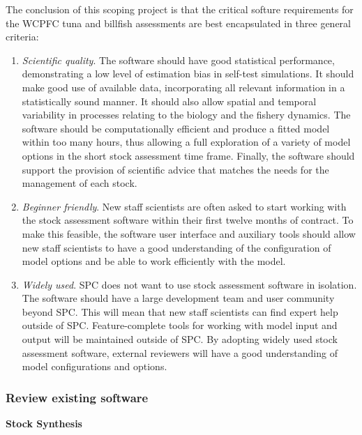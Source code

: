\documentclass{SCreport}
\begin{document}
The conclusion of this scoping project is that the critical softure requirements
for the WCPFC tuna and billfish assessments are best encapsulated in three
general criteria:

\begin{enumerate}
  \item \textit{Scientific quality}. The software should have good statistical
  performance, demonstrating a low level of estimation bias in self-test
  simulations. It should make good use of available data, incorporating all
  relevant information in a statistically sound manner. It should also allow
  spatial and temporal variability in processes relating to the biology and the
  fishery dynamics. The software should be computationally efficient and produce
  a fitted model within too many hours, thus allowing a full exploration of a
  variety of model options in the short stock assessment time frame. Finally,
  the software should support the provision of scientific advice that matches
  the needs for the management of each stock.
  \item \textit{Beginner friendly}. New staff scientists are often asked to
  start working with the stock assessment software within their first twelve
  months of contract. To make this feasible, the software user interface and
  auxiliary tools should allow new staff scientists to have a good understanding
  of the configuration of model options and be able to work efficiently with the
  model.
  \item \textit{Widely used}. SPC does not want to use stock assessment software
  in isolation. The software should have a large development team and user
  community beyond SPC. This will mean that new staff scientists can find expert
  help outside of SPC. Feature-complete tools for working with model input and
  output will be maintained outside of SPC. By adopting widely used stock
  assessment software, external reviewers will have a good understanding of
  model configurations and options.
\end{enumerate}

\vspace{1ex}

\subsubsection{Review existing software}

\textbf{Stock Synthesis}

\vspace{-1ex}
\end{document}
